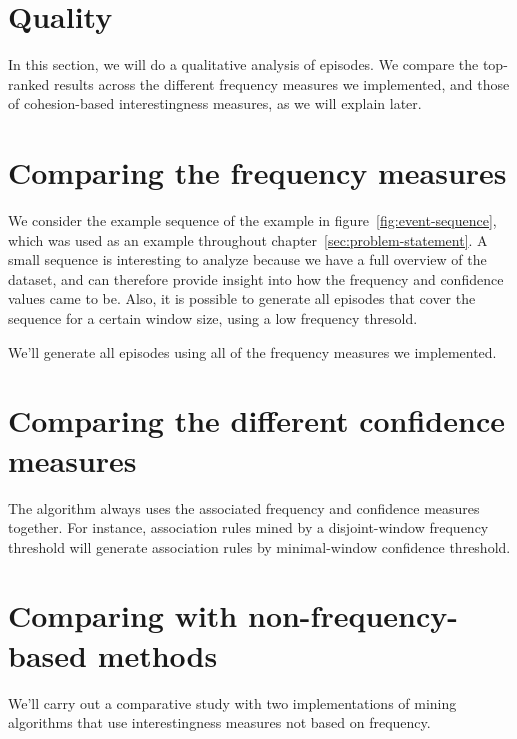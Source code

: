\section{Quality}

In this section, we will do a qualitative analysis of episodes. We compare the top-ranked results across the different frequency measures we implemented, and those of cohesion-based interestingness measures, as we will explain later.

\section{Comparing the frequency measures}

We consider the example sequence of the example in figure~\ref{fig:event-sequence}, which was used as an example throughout chapter~\ref{sec:problem-statement}. A small sequence is interesting to analyze because we have a full overview of the dataset, and can therefore provide insight into how the frequency and confidence values came to be. Also, it is possible to generate all episodes that cover the sequence for a certain window size, using a low frequency thresold.

We'll generate all episodes using all of the frequency measures we implemented.

\section{Comparing the different confidence measures}

The algorithm always uses the associated frequency and confidence measures together. For instance, association rules mined by a disjoint-window frequency threshold will generate association rules by  minimal-window confidence threshold.

\section{Comparing with non-frequency-based methods}

We'll carry out a comparative study with two implementations of mining algorithms that use interestingness measures not based on frequency.

